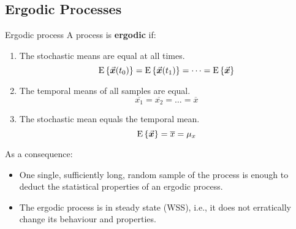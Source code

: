 \begin{refsection}
\subsection{Ergodic Processes}

\begin{definition}{Ergodic process}
	 A process is \textbf{ergodic} if:
	\begin{enumerate}
		\item The stochastic means are equal at all times.
		\begin{equation}
			\mathrm{E}\left\{\vec{\bm{x}}(t_0)\right\} = \mathrm{E}\left\{\vec{\bm{x}}(t_1)\right\} = \dots = \mathrm{E}\left\{\vec{\bm{x}}\right\}
		\end{equation}
		\item The temporal means of all samples are equal.
		\begin{equation}
			\overline{x_1} = \overline{x_2} = \dots = \overline{x}
		\end{equation}
		\item The stochastic mean equals the temporal mean.
		\begin{equation}
			\mathrm{E}\left\{\vec{\bm{x}}\right\} = \overline{x} = \mu_x
		\end{equation}
	\end{enumerate}
\end{definition}

As a consequence:
\begin{itemize}
	\item One single, sufficiently long, random sample of the process is enough to deduct the statistical properties of an ergodic process.
	\item The ergodic process is in steady state (\ac{WSS}), i.e., it does not erratically change its behaviour and properties.
\end{itemize}


\end{refsection}
